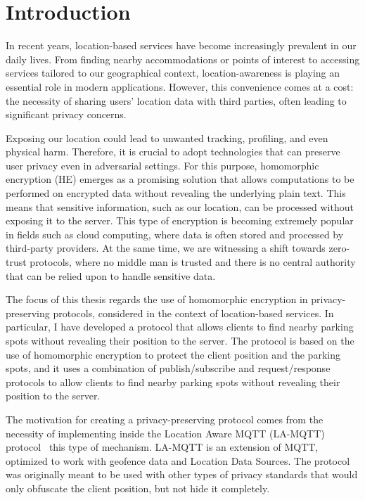 \chapter{Introduction} \label{chap:intro}

%
%

In recent years, location-based services have become increasingly prevalent in our daily lives. From finding nearby accommodations or points of interest to accessing services tailored to our geographical context, location-awareness is playing an essential role in modern applications. However, this convenience comes at a cost: the necessity of sharing users' location data with third parties, often leading to significant privacy concerns.

Exposing our location could lead to unwanted tracking, profiling, and even physical harm. Therefore, it is crucial to adopt technologies that can preserve user privacy even in adversarial settings. For this purpose, homomorphic encryption (HE) emerges as a promising solution that allows computations to be performed on encrypted data without revealing the underlying plain text. This means that sensitive information, such as our location, can be processed without exposing it to the server. This type of encryption is becoming extremely popular in fields such as cloud computing, where data is often stored and processed by third-party providers. 
At the same time, we are witnessing a shift towards zero-trust protocols, where no middle man is trusted and there is no central authority that can be relied upon to handle sensitive data. 


The focus of this thesis regards the use of homomorphic encryption in privacy-preserving protocols, considered in the context of location-based services. In particular, I have developed a protocol that allows clients to find nearby parking spots without revealing their position to the server. The protocol is based on the use of homomorphic encryption to protect the client position and the parking spots, and it uses a combination of publish/subscribe and request/response protocols to allow clients to find nearby parking spots without revealing their position to the server.

The motivation for creating a privacy-preserving protocol comes from the necessity of implementing inside the Location Aware MQTT (LA-MQTT) protocol~\cite{montori2022lamqtt} this type of mechanism. LA-MQTT is an extension of MQTT, optimized to work with geofence data and Location Data Sources. The protocol was originally meant to be used with other types of privacy standards that would only obfuscate the client position, but not hide it completely.
